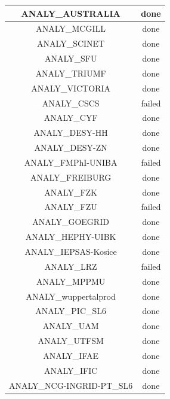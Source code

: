 \begin{longtable}{|c|c|}
	\hline
	\color{black}ANALY\_AUSTRALIA & \color{green}done \\
	\hline
	\color{black}ANALY\_MCGILL & \color{green}done \\
	\hline
	\color{black}ANALY\_SCINET & \color{green}done \\
	\hline
	\color{black}ANALY\_SFU & \color{green}done \\
	\hline
	\color{black}ANALY\_TRIUMF & \color{green}done \\
	\hline
	\color{black}ANALY\_VICTORIA & \color{green}done \\
	\hline
	\color{black}ANALY\_CSCS & \color{red}failed \\
	\hline
	\color{black}ANALY\_CYF & \color{green}done \\
	\hline
	\color{black}ANALY\_DESY-HH & \color{green}done \\
	\hline
	\color{black}ANALY\_DESY-ZN & \color{green}done \\
	\hline
	\color{black}ANALY\_FMPhI-UNIBA & \color{red}failed \\
	\hline
	\color{black}ANALY\_FREIBURG & \color{green}done \\
	\hline
	\color{black}ANALY\_FZK & \color{green}done \\
	\hline
	\color{black}ANALY\_FZU & \color{red}failed \\
	\hline
	\color{black}ANALY\_GOEGRID & \color{green}done \\
	\hline
	\color{black}ANALY\_HEPHY-UIBK & \color{green}done \\
	\hline
	\color{black}ANALY\_IEPSAS-Kosice & \color{green}done \\
	\hline
	\color{black}ANALY\_LRZ & \color{red}failed \\
	\hline
	\color{black}ANALY\_MPPMU & \color{green}done \\
	\hline
	\hline
	\color{black}ANALY\_wuppertalprod & \color{green}done \\
	\hline
	\color{black}ANALY\_PIC\_SL6 & \color{green}done \\
	\hline
	\color{black}ANALY\_UAM & \color{green}done \\
	\hline
	\color{black}ANALY\_UTFSM & \color{green}done \\
	\hline
	\color{black}ANALY\_IFAE & \color{green}done \\
	\hline
	\color{black}ANALY\_IFIC & \color{green}done \\
	\hline
	\color{black}ANALY\_NCG-INGRID-PT\_SL6 & \color{green}done \\

\end{longtable}
